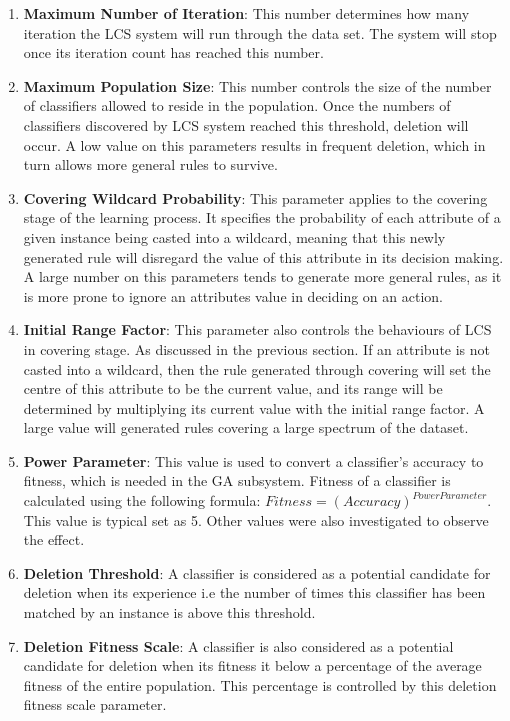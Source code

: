 \documentclass[11pt]{article}
\begin{document}
\begin{enumerate}
	\itemsep0em
	\item \textbf{Maximum Number of Iteration}: This number determines how many iteration the LCS system will run through the data set. The system will stop once its iteration count has reached this number.
	\item \textbf{Maximum Population Size}: This number controls the size of the number of classifiers allowed to reside in the population. Once the numbers of classifiers discovered by LCS system reached this threshold, deletion will occur. A low value on this parameters results in frequent deletion, which in turn allows more general rules to survive.
	\item \textbf{Covering Wildcard Probability}: This parameter applies to the covering stage of the learning process. It specifies the probability of each attribute of a given instance being casted into a wildcard, meaning that this newly generated rule will disregard the value of this attribute in its decision making. A large number on this parameters tends to generate more general rules, as it is more prone to ignore an attributes value in deciding on an action.
	\item \textbf{Initial Range Factor}: This parameter also controls the behaviours of LCS in covering stage. As discussed in the previous section. If an attribute is not casted into a wildcard, then the rule generated through covering will set the centre of this attribute to be the current value, and its range will be determined by multiplying its current value with the initial range factor. A large value will generated rules covering a large spectrum of the dataset.
	\item \textbf{Power Parameter}:	This value is used to convert a classifier's accuracy to fitness, which is needed in the GA subsystem. Fitness of a classifier is calculated using the following formula:	$Fitness = (Accuracy)^{Power Parameter}$. This value is typical set as 5. Other values were also investigated to observe the effect.
	\item \textbf{Deletion Threshold}: A classifier is considered as a potential candidate for deletion when its experience i.e the number of times this classifier has been matched by an instance is above this threshold.
	\item \textbf{Deletion Fitness Scale}: A classifier is also considered as a potential candidate for deletion when its fitness it below a percentage of the average fitness of the entire population. This percentage is controlled by this deletion fitness scale parameter.

\end{enumerate}
\end{document}
